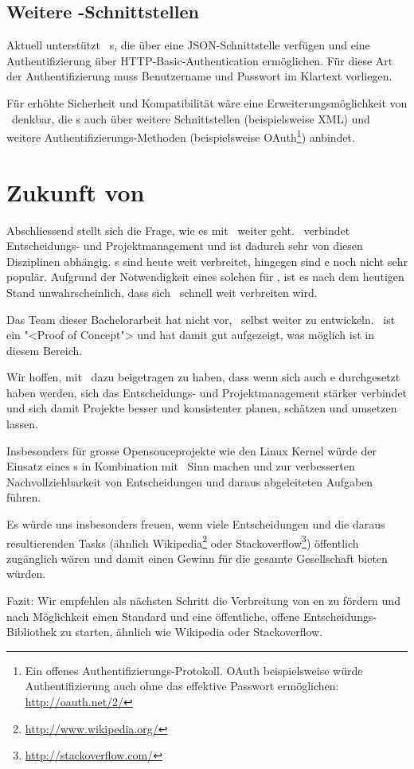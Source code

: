 		\subsection{Weitere \ppt-Schnittstellen}
		\label{subsec:morePPTInterfaces}
			Aktuell unterstützt \eeppi\ \ppt s, die über eine JSON-Schnittstelle verfügen
			und eine Authentifizierung über HTTP-Basic-Authentication ermöglichen.
			Für diese Art der Authentifizierung muss Benutzername und Passwort im Klartext vorliegen.
			
			Für erhöhte Sicherheit und Kompatibilität wäre eine Erweiterungsmöglichkeit von \eeppi\ denkbar,
			die \ppt s auch über weitere Schnittstellen (beispielsweise XML)
			und weitere Authentifizierungs-Methoden (beispielsweise OAuth\footnote{Ein offenes Authentifizierungs-Protokoll. OAuth beispielsweise würde Authentifizierung auch ohne das effektive Passwort ermöglichen: \url{http://oauth.net/2/}}) anbindet.
			
	\section{Zukunft von \eeppi}
		Abschliessend stellt sich die Frage, wie es mit \eeppi\ weiter geht.
		\eeppi\ verbindet Ent\-schei\-dungs- und Pro\-jekt\-management und ist dadurch sehr von diesen Disziplinen abhängig.
		\ppt s sind heute weit verbreitet, hingegen sind \dks e noch nicht sehr populär.
		Aufgrund der Notwendigkeit eines solchen für \eeppi, ist es nach dem heutigen Stand unwahrscheinlich, dass sich \eeppi\ schnell weit verbreiten wird.
		
		Das Team dieser Bachelorarbeit hat nicht vor, \eeppi\ selbst weiter zu entwickeln.
		\eeppi\ ist ein "<Proof of Concept"> und hat damit gut aufgezeigt, was möglich ist in diesem Bereich.
		
		Wir hoffen, mit \eeppi\ dazu beigetragen zu haben, dass wenn sich auch \dks e durchgesetzt haben werden,
		sich das Entscheidungs- und Projektmanagement stärker verbindet und sich damit Projekte besser und konsistenter planen,  schätzen und umsetzen lassen.
		
		Insbesonders für grosse Opensouceprojekte wie den Linux Kernel würde der Einsatz eines \dks s in Kombination mit \eeppi\ Sinn machen und zur verbesserten Nachvollziehbarkeit von Entscheidungen und daraus abgeleiteten Aufgaben führen.
		
		Es würde uns insbesonders freuen,
		wenn viele Entscheidungen und die daraus resultierenden Tasks
		(ähnlich Wikipedia\footnote{\url{http://www.wikipedia.org/}} oder Stackoverflow\footnote{\url{http://stackoverflow.com/}})
		öffentlich zugänglich wären und damit einen Gewinn für die gesamte Gesellschaft bieten würden.
		
		Fazit: Wir empfehlen als nächsten Schritt die Verbreitung von \dks en zu fördern
		und nach Möglichkeit einen Standard und eine öffentliche, offene Entscheidungs-Bibliothek zu starten,
		ähnlich wie Wikipedia oder Stackoverflow.

